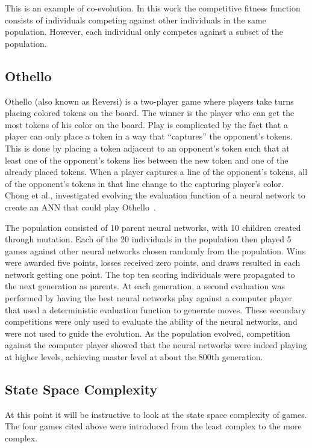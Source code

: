 This is an example of co-evolution. In this work the competitive fitness
function consists of individuals competing against other individuals in the same
population. However, each individual only competes against a subset of the
population.

\subsection{Othello}

Othello (also known as Reversi) is a two-player game where players take turns
placing colored tokens on the board. The winner is the player who can get the
most tokens of his color on the board. Play is complicated by the fact that a
player can only place a token in a way that ``captures'' the opponent's tokens.
This is done by placing a token adjacent to an opponent's token such that at
least one of the opponent's tokens lies between the new token and one of the
already placed tokens. When a player captures a line of the opponent's tokens,
all of the opponent's tokens in that line change to the capturing player's
color. Chong et al., investigated evolving the evaluation function of a neural
network to create an ANN that could play Othello~\cite{ChongTW05}.

The population consisted of 10 parent neural networks, with 10 children created
through mutation. Each of the 20 individuals in the population then played 5
games against other neural networks chosen randomly from the population. Wins
were awarded five points, losses received zero points, and draws resulted in
each network getting one point. The top ten scoring individuals were propagated
to the next generation as parents. At each generation, a second evaluation was
performed by having the best neural networks play against a computer player that
used a deterministic evaluation function to generate moves. These secondary
competitions were only used to evaluate the ability of the neural networks, and
were not used to guide the evolution. As the population evolved, competition
against the computer player showed that the neural networks were indeed playing
at higher levels, achieving master level at about the 800th generation.

\subsection{State Space Complexity}
At this point it will be instructive to look at the state space complexity of
games. The four games cited above were introduced from the least complex to the
more complex.

